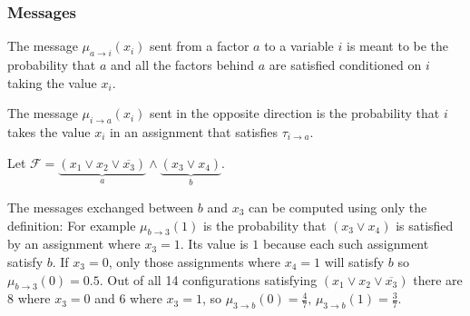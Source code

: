 \subsubsection{Messages}

The message $\mu_{a \rightarrow i}(x_i)$ sent from a factor $a$ to a variable $i$ is meant to be the probability that $a$ and all the factors behind $a$ are satisfied conditioned on $i$ taking the value $x_i$. 


The message $\mu_{i \rightarrow a}(x_i)$ sent in the opposite direction is the probability that $i$ takes the value $x_i$ in an assignment that satisfies $\tau_{i \rightarrow a}$.

\begin{example}
Let $\mathcal{F} = \underbrace{(x_1 \lor x_2 \lor \overline{x_3})}_a  \land \underbrace{(x_3 \lor x_4)}_b $.
\end{example}
\begin{figure}[h]
\centering

\end{figure}
The messages exchanged between $b$ and $x_3$ can be computed using only the definition: \newline
For example $\mu_{b \rightarrow 3}(1)$ is the probability that $(x_3 \lor x_4)$ is satisfied by an assignment where $x_3 = 1$. Its value is $1$ because each such assignment satisfy $b$. If $x_3 = 0$, only those assignments where $x_4 = 1$ will satisfy $b$ so $\mu_{b \rightarrow 3}(0) = 0.5$. \newline
Out of all 14 configurations satisfying $(x_1 \lor x_2 \lor \overline{x_3})$ there are $8$ where $x_3 = 0$ and $6$ where $x_3 = 1$, so $\mu_{3 \rightarrow b}(0) = \frac{4}{7}, \, \mu_{3 \rightarrow b}(1) = \frac{3}{7}$. 

